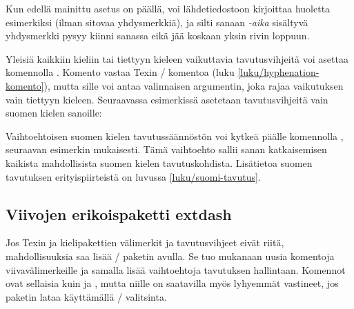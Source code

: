 \begin{koodilohkosis}
\end{koodilohkosis}

\noindent
Kun edellä mainittu asetus on päällä, voi lähdetiedostoon kirjoittaa
huoletta esimerkiksi  (ilman sitovaa
yhdysmerkkiä), ja silti sanaan \emph{\mbox{-aika}} sisältyvä yhdysmerkki
pysyy kiinni sanassa eikä jää koskaan yksin rivin loppuun.

Yleisiä kaikkiin kieliin tai tiettyyn kieleen vaikuttavia
tavutusvihjeitä voi asettaa komennolla .
Komento vastaa Texin \-/ komentoa (luku
\ref{luku/hyphenation-komento}), mutta sille voi antaa valinnaisen
argumentin, joka rajaa vaikutuksen vain tiettyyn kieleen. Seuraavassa
esimerkissä asetetaan tavutusvihjeitä vain suomen kielen sanoille:

\begin{koodilohkosis}
\end{koodilohkosis}

\noindent
Vaihtoehtoisen suomen kielen tavutussäännöstön voi kytkeä päälle
komennolla , seuraavan esimerkin mukaisesti. Tämä
vaihtoehto sallii sanan katkaisemisen kaikista mahdollisista suomen
kielen tavutuskohdista. Lisätietoa suomen tavutuksen erityispiirteistä
on luvussa \ref{luku/suomi-tavutus}.

\begin{koodilohkosis}
\end{koodilohkosis}

\subsection{Viivojen erikoispaketti extdash}
\label{luku/tavutus-extdash}

Jos Texin ja kielipakettien välimerkit ja tavutusvihjeet eivät riitä,
mahdollisuuksia saa lisää \-/ paketin avulla. Se
tuo mukanaan uusia komentoja viivavälimerkeille ja samalla lisää
vaihtoehtoja tavutuksen hallintaan. Komennot ovat sellaisia kuin
 ja , mutta niille on saatavilla myös
lyhyemmät vastineet, jos paketin lataa käyttämällä
\-/ valitsinta.

